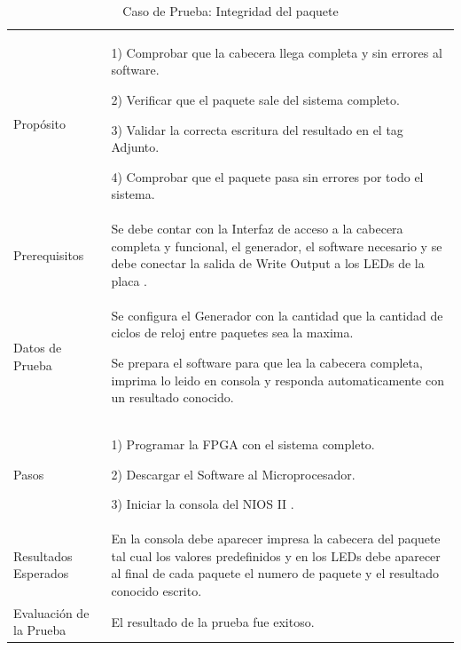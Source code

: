 \begin{table}
	\begin{tabular}{|>{\columncolor[gray]{0.8}}l|p{9cm}|} \hline
\multicolumn{2}{|>{\columncolor[gray]{0.8}}l|}{\textbf{Caso de Prueba: Integridad del paquete }}\\ \hline
Propósito  & 1) Comprobar que la cabecera llega completa y sin errores al software. 

2) Verificar que el paquete sale del sistema completo.

3) Validar la correcta escritura del resultado en el tag Adjunto.

4) Comprobar que el paquete pasa sin errores por todo el sistema. 
\\ \hline
 Prerequisitos  & Se debe contar con la Interfaz de acceso a la cabecera completa y funcional, el generador, el software necesario y se debe conectar la salida de Write Output a los LEDs de la placa .\\ \hline
 Datos de Prueba & Se configura el Generador con la cantidad que la cantidad de ciclos de reloj entre paquetes sea la maxima. 

Se prepara el software para que lea la cabecera completa, imprima lo leido en consola y responda automaticamente con un resultado conocido. 
 \\ \hline
 Pasos & 1) Programar la FPGA con el sistema completo.

2) Descargar el Software al Microprocesador.

3) Iniciar la consola del NIOS II .
\\ \hline
 Resultados Esperados & En la consola debe aparecer impresa la cabecera del paquete tal cual los valores predefinidos y en los LEDs debe aparecer al final de cada paquete el numero de paquete y el resultado conocido escrito.  \\ \hline
 Evaluación de la Prueba  & El resultado de la prueba fue exitoso.\\ \hline
	\end{tabular}
	\caption{Caso de Prueba: Integridad del paquete}
	\label{tab:integridad}
\end{table}
